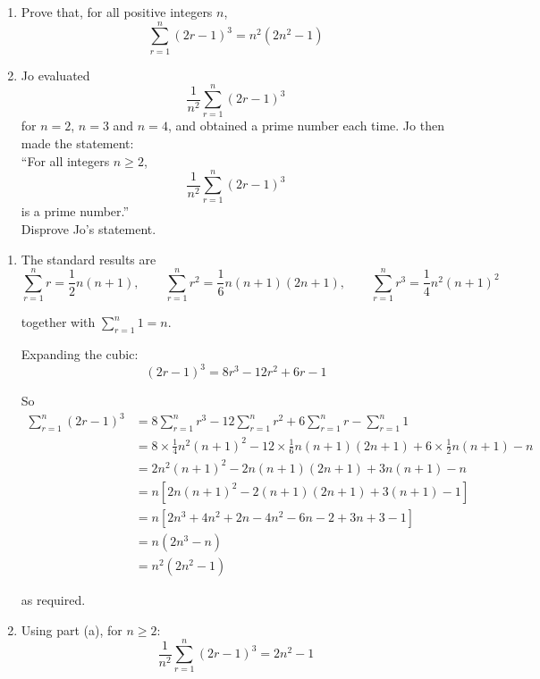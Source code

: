 \documentclass[leqno]{article}
\begin{document}
\begin{enumerate}[
  label=\textbf{\arabic*.},
  leftmargin=*,
  topsep=0pt,
  partopsep=0pt,
  parsep=0pt
]
\newpage

\questionitem

\begin{enumerate}[label=\textbf{(\alph*)}]
  \item Prove that, for all positive integers $n$,
  \[\sum_{r=1}^{n} (2r-1)^3 = n^2\left(2n^2-1\right)\] 
  \item Jo evaluated
  \[\dfrac{1}{n^2}\sum_{r=1}^{n} (2r-1)^3\]
  for $n = 2$, $n = 3$ and $n = 4$, and obtained a prime number each time. Jo then made the statement: \\

  ``For all integers $n \geq 2$,
  \[\dfrac{1}{n^2}\sum_{r=1}^{n} (2r-1)^3\]
  is a prime number.'' \\

  Disprove Jo's statement.  \\
\end{enumerate}

\vspace*{10pt}

\begin{djsSolution}
\begin{enumerate}[label=\textbf{(\alph*)}, start=1]
  \item The standard results are
\[
\sum_{r=1}^{n} r=\frac12 n(n+1),\qquad \sum_{r=1}^{n} r^2=\frac16 n(n+1)(2n+1),\qquad \sum_{r=1}^{n} r^3=\frac14 n^2(n+1)^2
\]

together with \(\sum_{r=1}^{n} 1 = n\).

Expanding the cubic:
\[
(2r-1)^3 = 8r^3-12r^2+6r-1
\]

So
\begin{align*}
\sum_{r=1}^{n}(2r-1)^3 &= 8\sum_{r=1}^{n} r^3-12\sum_{r=1}^{n} r^2+6\sum_{r=1}^{n} r-\sum_{r=1}^{n} 1\\
&= 8\times\frac14 n^2(n+1)^2-12\times\frac16 n(n+1)(2n+1)+6\times\frac12 n(n+1)-n\\
&= 2n^2(n+1)^2-2n(n+1)(2n+1)+3n(n+1)-n\\
&= n\left[2n(n+1)^2-2(n+1)(2n+1)+3(n+1)-1\right]\\
&= n\left[2n^3+4n^2+2n-4n^2-6n-2+3n+3-1\right]\\
&= n\left(2n^3-n\right)\\
&= n^2\left(2n^2-1\right)
\end{align*}

as required.

  \item Using part (a), for \(n\geq 2\):
\[
\frac{1}{n^2}\sum_{r=1}^{n}(2r-1)^3 = 2n^2-1
\]


\end{enumerate}
\end{djsSolution}
\end{enumerate}
\end{document}
